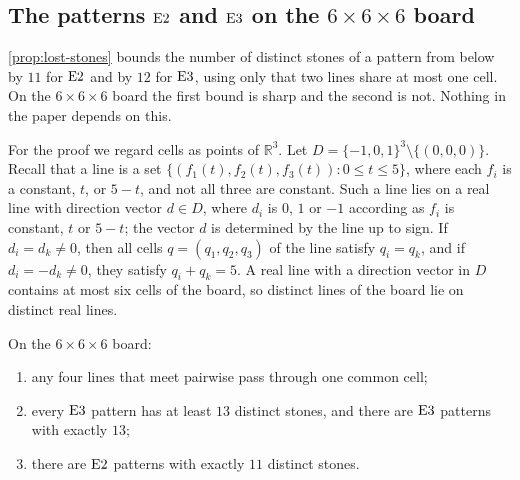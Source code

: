\subsection{The patterns \texorpdfstring{$\mathrm{E2}$}{E2} and \texorpdfstring{$\mathrm{E3}$}{E3} on the
\texorpdfstring{$6\times6\times6$}{6x6x6} board}\label{sec:extra-e23}

\cref{prop:lost-stones} bounds the number of distinct stones of a pattern from below by $11$ for
$\mathrm{E2}$ and by $12$ for $\mathrm{E3}$, using only that two lines share at most one cell. On the
$6\times6\times6$ board the first bound is sharp and the second is not. Nothing in the paper depends on
this.

For the proof we regard cells as points of $\mathbb{R}^3$. Let
$D=\{-1,0,1\}^3\setminus\{(0,0,0)\}$. Recall that a line is a set $\{(f_1(t),f_2(t),f_3(t)):0\le t\le 5\}$,
where each $f_i$ is a constant, $t$, or $5-t$, and not all three are constant. Such a line lies on a real
line with direction vector $d\in D$, where $d_i$ is $0$, $1$ or $-1$ according as $f_i$ is constant, $t$ or
$5-t$; the vector $d$ is determined by the line up to sign. If $d_i=d_k\ne 0$, then all cells
$q=(q_1,q_2,q_3)$ of the line satisfy $q_i=q_k$, and if $d_i=-d_k\ne 0$, they satisfy $q_i+q_k=5$. A real line
with a direction vector in $D$ contains at most six cells of the board, so distinct lines of the board lie
on distinct real lines.

\begin{proposition}\label{prop:e23-min}
On the $6\times6\times6$ board:
\begin{enumerate}[label=\textup{(\alph*)},leftmargin=2.4em]
\item any four lines that meet pairwise pass through one common cell;
\item every $\mathrm{E3}$ pattern has at least $13$ distinct stones, and there are $\mathrm{E3}$ patterns with
  exactly $13$;
\item there are $\mathrm{E2}$ patterns with exactly $11$ distinct stones.
\end{enumerate}
\end{proposition}

